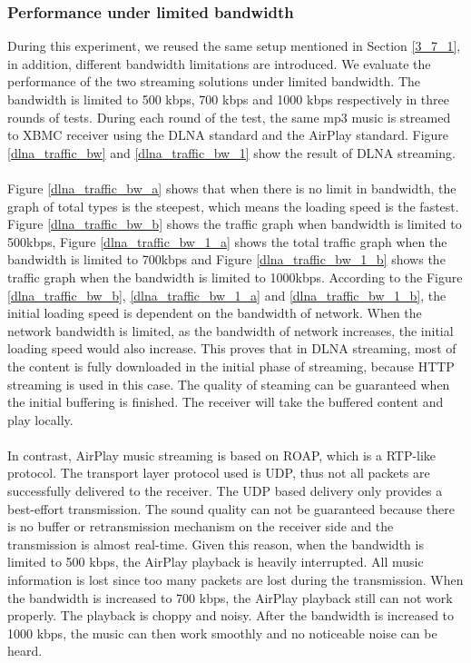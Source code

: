 \subsubsection{Performance under limited bandwidth\label{4_1_2}}
During this experiment, we reused the same setup mentioned in Section \ref{3_7_1}, in addition, different bandwidth limitations are introduced. We evaluate the performance of the two streaming solutions under limited bandwidth. The bandwidth is limited to 500 kbps, 700 kbps and 1000 kbps respectively in three rounds of tests. During each round of the test, the same mp3 music is streamed to XBMC receiver using the DLNA standard and the AirPlay standard. Figure \ref{dlna_traffic_bw} and \ref{dlna_traffic_bw_1} show the result of DLNA streaming.\\
\\
Figure \ref{dlna_traffic_bw_a} shows that when there is no limit in bandwidth, the graph of total types is the steepest, which means the loading speed is the fastest. Figure \ref{dlna_traffic_bw_b} shows the traffic graph when bandwidth is limited to 500kbps, Figure \ref{dlna_traffic_bw_1_a} shows the total traffic graph when the bandwidth is limited to 700kbps and Figure \ref{dlna_traffic_bw_1_b} shows the traffic graph when the bandwidth is limited to 1000kbps. According to the Figure \ref{dlna_traffic_bw_b}, \ref{dlna_traffic_bw_1_a} and \ref{dlna_traffic_bw_1_b}, the initial loading speed is dependent on the bandwidth of network. When the network bandwidth is limited, as the bandwidth of network increases, the initial loading speed would also increase. This proves that in DLNA streaming, most of the content is fully downloaded in the initial phase of streaming, because HTTP streaming is used in this case. The quality of steaming can be guaranteed when the initial buffering is finished. The receiver will take the buffered content and play locally.\\
\\
In contrast, AirPlay music streaming is based on ROAP, which is a RTP-like protocol. The transport layer protocol used is UDP, thus not all packets are successfully delivered to the receiver. The UDP based delivery only provides a best-effort transmission. The sound quality can not be guaranteed because there is no buffer or retransmission mechanism on the receiver side and the transmission is almost real-time. Given this reason, when the bandwidth is limited to 500 kbps, the AirPlay playback is heavily interrupted. All music information is lost since too many packets are lost during the transmission. When the bandwidth is increased to 700 kbps, the AirPlay playback still can not work properly. The playback is choppy and noisy. After the bandwidth is increased to 1000 kbps, the music can then work smoothly and no noticeable noise can be heard.\\
